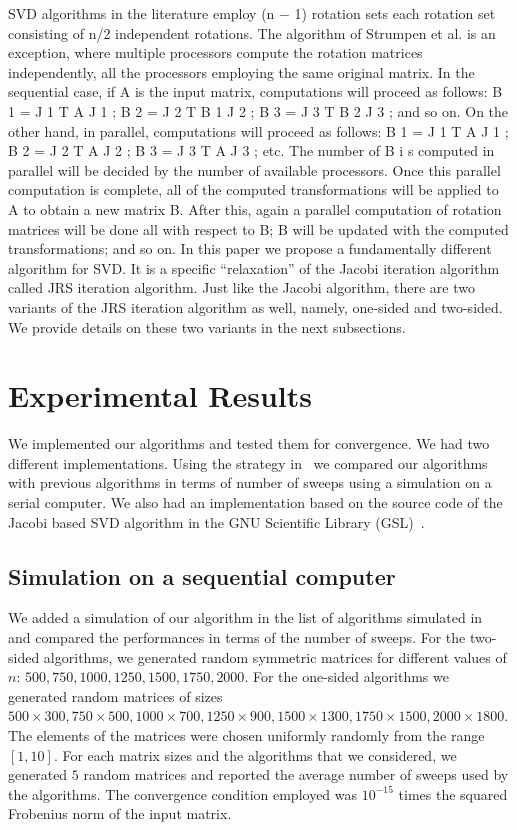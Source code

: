 \documentclass[10pt, conference, compsocconf]{IEEEtran}
\begin{document}
SVD algorithms in the literature employ (n − 1) rotation sets
each rotation set consisting of n/2 independent rotations. The
algorithm of Strumpen et al. is an exception, where multiple
processors compute the rotation matrices independently, all
the processors employing the same original matrix. In the
sequential case, if A is the input matrix, computations will
proceed as follows: B 1 = J 1 T A J 1 ; B 2 = J 2 T B 1 J 2 ; B 3 =
J 3 T B 2 J 3 ; and so on. On the other hand, in parallel, computations
will proceed as follows: B 1 = J 1 T A J 1 ; B 2 = J 2 T A J 2 ; B 3 =
J 3 T A J 3 ; etc. The number of B i s computed in parallel will
be decided by the number of available processors. Once
this parallel computation is complete, all of the computed
transformations will be applied to A to obtain a new matrix
B. After this, again a parallel computation of rotation matrices
will be done all with respect to B; B will be updated with the
computed transformations; and so on.
In this paper we propose a fundamentally different algorithm
for SVD. It is a specific “relaxation” of the Jacobi iteration
algorithm called JRS iteration algorithm. Just like the Jacobi
algorithm, there are two variants of the JRS iteration algorithm
as well, namely, one-sided and two-sided. We provide details
on these two variants in the next subsections.


\section{Experimental Results}
\label{sec:results}

We implemented our algorithms and tested them for convergence. We had two different implementations. Using the strategy in~\cite{rajasekaran2008relaxation} we compared our algorithms with previous algorithms in terms of number of sweeps using a simulation on a serial computer. We also had an implementation based on the source code of the Jacobi based SVD algorithm in the GNU Scientific Library (GSL)~\cite{galassi1996gnu}.

\subsection{Simulation on a sequential computer}

We added a simulation of our algorithm in the list of algorithms simulated in~\cite{rajasekaran2008relaxation} and compared the performances in terms of the number
of sweeps. For the two-sided algorithms, we generated random symmetric matrices for different values of $n$: $500, 750, 1000, 1250, 1500, 1750, 2000$. For the one-sided algorithms we generated random matrices of sizes $500 \times 300, 750 \times 500, 1000 \times 700, 1250 \times 900, 1500 \times 1300, 1750 \times 1500, 2000 \times 1800$.  The elements of the matrices were chosen uniformly randomly from the range $[1,10]$. For each matrix sizes and the algorithms that we considered, we generated $5$ random matrices and reported the average number of sweeps used by the algorithms. The convergence condition employed was $10^{-15}$ times the squared Frobenius norm of the input matrix.
\end{document}
